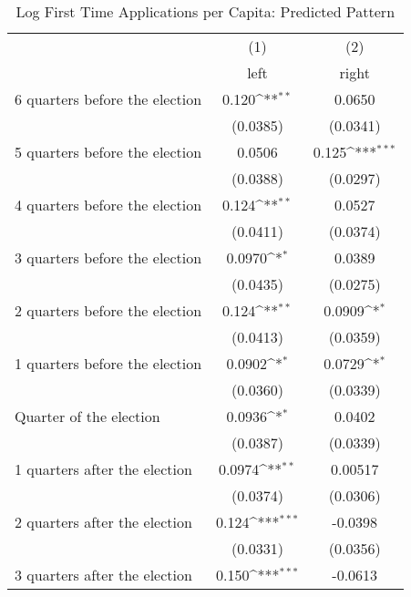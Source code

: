 \begin{table}[htbp]\centering
\def\sym#1{\ifmmode^{#1}\else\(^{#1}\)\fi}
\caption{Log First Time Applications per Capita: Predicted Pattern}
\begin{tabular}{l*{2}{c}}
\hline\hline
                    &\multicolumn{1}{c}{(1)}&\multicolumn{1}{c}{(2)}\\
                    &\multicolumn{1}{c}{left}&\multicolumn{1}{c}{right}\\
\hline
 6 quarters before the election&       0.120\sym{**} &      0.0650         \\
                    &    (0.0385)         &    (0.0341)         \\
[1em]
 5 quarters before the election&      0.0506         &       0.125\sym{***}\\
                    &    (0.0388)         &    (0.0297)         \\
[1em]
 4 quarters before the election&       0.124\sym{**} &      0.0527         \\
                    &    (0.0411)         &    (0.0374)         \\
[1em]
 3 quarters before the election&      0.0970\sym{*}  &      0.0389         \\
                    &    (0.0435)         &    (0.0275)         \\
[1em]
 2 quarters before the election&       0.124\sym{**} &      0.0909\sym{*}  \\
                    &    (0.0413)         &    (0.0359)         \\
[1em]
 1 quarters before the election&      0.0902\sym{*}  &      0.0729\sym{*}  \\
                    &    (0.0360)         &    (0.0339)         \\
[1em]
Quarter of the election&      0.0936\sym{*}  &      0.0402         \\
                    &    (0.0387)         &    (0.0339)         \\
[1em]
 1 quarters after the election&      0.0974\sym{**} &     0.00517         \\
                    &    (0.0374)         &    (0.0306)         \\
[1em]
 2 quarters after the election&       0.124\sym{***}&     -0.0398         \\
                    &    (0.0331)         &    (0.0356)         \\
[1em]
 3 quarters after the election&       0.150\sym{***}&     -0.0613         \\

\end{tabular}
\end{table}
